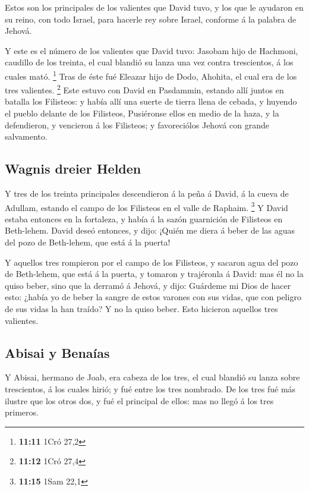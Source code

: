  Estos son los principales de los valientes que David tuvo,
y los que le ayudaron en su reino, con todo Israel, para hacerle rey
sobre Israel, conforme á la palabra de Jehová.

 Y este es el número de los valientes que David tuvo:
Jasobam hijo de Hachmoni, caudillo de los treinta, el cual blandió su
lanza una vez contra trescientos, á los cuales mató. \footnote{\textbf{11:11}
  1Cró 27,2}  Tras de éste fué Eleazar hijo de Dodo,
Ahohita, el cual era de los tres valientes. \footnote{\textbf{11:12}
  1Cró 27,4}  Este estuvo con David en Pasdammin, estando
allí juntos en batalla los Filisteos: y había allí una suerte de tierra
llena de cebada, y huyendo el pueblo delante de los Filisteos,
 Pusiéronse ellos en medio de la haza, y la defendieron, y
vencieron á los Filisteos; y favoreciólos Jehová con grande salvamento.

\hypertarget{wagnis-dreier-helden}{%
\subsection{Wagnis dreier Helden}\label{wagnis-dreier-helden}}

 Y tres de los treinta principales descendieron á la peña á
David, á la cueva de Adullam, estando el campo de los Filisteos en el
valle de Raphaim. \footnote{\textbf{11:15} 1Sam 22,1}  Y
David estaba entonces en la fortaleza, y había á la sazón guarnición de
Filisteos en Beth-lehem.  David deseó entonces, y dijo:
¡Quién me diera á beber de las aguas del pozo de Beth-lehem, que está á
la puerta!

 Y aquellos tres rompieron por el campo de los Filisteos, y
sacaron agua del pozo de Beth-lehem, que está á la puerta, y tomaron y
trajéronla á David: mas él no la quiso beber, sino que la derramó á
Jehová, y dijo:  Guárdeme mi Dios de hacer esto: ¿había yo
de beber la sangre de estos varones con sus vidas, que con peligro de
sus vidas la han traído? Y no la quiso beber. Esto hicieron aquellos
tres valientes.

\hypertarget{abisai-y-benauxedas}{%
\subsection{Abisai y Benaías}\label{abisai-y-benauxedas}}

 Y Abisai, hermano de Joab, era cabeza de los tres, el cual
blandió su lanza sobre trescientos, á los cuales hirió; y fué entre los
tres nombrado.  De los tres fué más ilustre que los otros
dos, y fué el principal de ellos: mas no llegó á los tres primeros.

